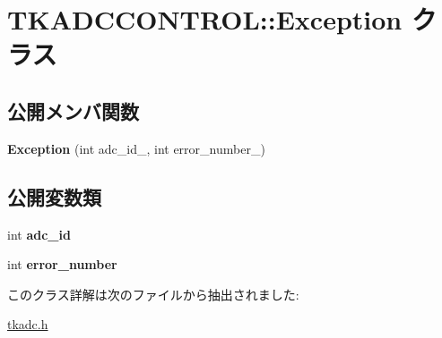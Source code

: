 \hypertarget{class_t_k_a_d_c_c_o_n_t_r_o_l_1_1_exception}{}\section{T\+K\+A\+D\+C\+C\+O\+N\+T\+R\+OL\+:\+:Exception クラス}
\label{class_t_k_a_d_c_c_o_n_t_r_o_l_1_1_exception}
\subsection*{公開メンバ関数}
\begin{DoxyCompactItemize}
\item 
\mbox{\label{class_t_k_a_d_c_c_o_n_t_r_o_l_1_1_exception_a5e12d43683d43a27bf710ac9fc03ae34}} 
{\bfseries Exception} (int adc\+\_\+id\+\_\+, int error\+\_\+number\+\_\+)
\end{DoxyCompactItemize}
\subsection*{公開変数類}
\begin{DoxyCompactItemize}
\item 
\mbox{\label{class_t_k_a_d_c_c_o_n_t_r_o_l_1_1_exception_a37d44653ca09c7fcfcfa218d2536297f}} 
int {\bfseries adc\+\_\+id}
\item 
\mbox{\label{class_t_k_a_d_c_c_o_n_t_r_o_l_1_1_exception_abaf7b00758addde29f044a356372efc4}} 
int {\bfseries error\+\_\+number}
\end{DoxyCompactItemize}


このクラス詳解は次のファイルから抽出されました\+:\begin{DoxyCompactItemize}
\item 
\hyperlink{tkadc_8h}{tkadc.\+h}\end{DoxyCompactItemize}
